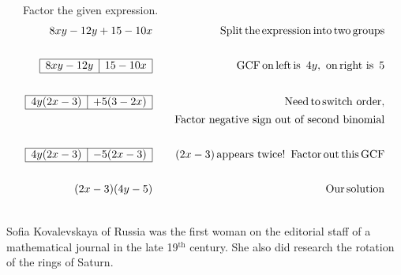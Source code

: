 \begin{example}~~~Factor the given expression.
  \begin{eqnarray*}
    8 x y - 12 y + 15 - 10 x &  & \operatorname{Split} \operatorname{the} \operatorname{expression}
    \operatorname{into} \operatorname{two} \operatorname{groups}\\
&&\\
    \begin{array}{|l|l|}
      \hline
      8 x y - 12 y & 15 - 10 x\\
      \hline
    \end{array} &  & \operatorname{GCF} \operatorname{on} \operatorname{left} \operatorname{is~} 4 y, \operatorname{~on}
    \operatorname{right~is~} 5\\
&&\\
    \begin{array}{|l|l|}
      \hline
      4 y (2 x - 3) & + 5 (3 - 2 x)\\
      \hline
    \end{array} &  & \operatorname{Need} \operatorname{to} \operatorname{switch~order},\\
		&& \text{~~~Factor~negative~sign~out~of~second~binomial}\\
&&\\
    \begin{array}{|l|l|}
      \hline
      4 y (2 x - 3) & - 5 (2 x - 3)\\
      \hline
    \end{array} &  & (2 x - 3) \operatorname{appears~twice} !
    \operatorname{~Factor} \operatorname{out} \operatorname{this} \operatorname{GCF}\\
&&\\
    (2 x - 3) (4 y - 5) &  & \operatorname{Our} \operatorname{solution}
  \end{eqnarray*}
\end{example}
~\\  
{} Sofia Kovalevskaya of Russia was the first woman
on the editorial staff of a mathematical journal in the late 19$^{\text{th}}$ century. She
also did research the rotation of the rings of Saturn.

%
